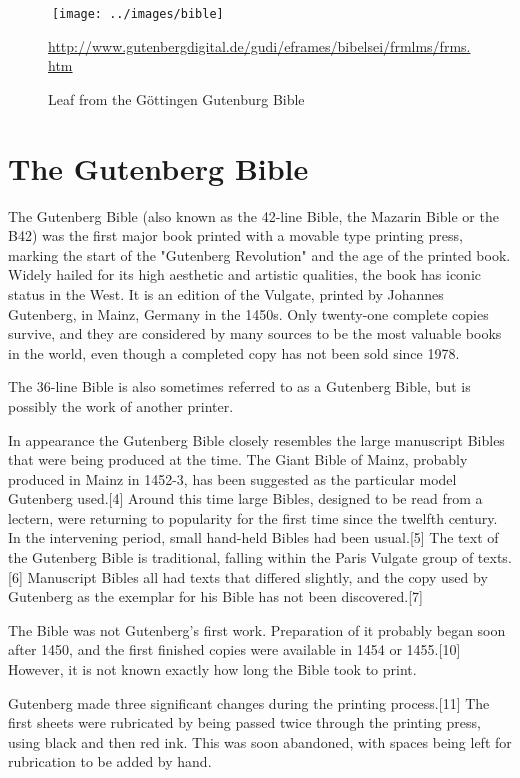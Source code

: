 {{\begin{figure*}
^^A\texttt{[image: ../images/bible]}
\caption{Leaf from the G\"ottingen Gutenburg Bible}
\url{http://www.gutenbergdigital.de/gudi/eframes/bibelsei/frmlms/frms.htm}
\label{fig:bible}
\end{figure*}

\section{The Gutenberg Bible}

The Gutenberg Bible (also known as the 42-line Bible, the Mazarin Bible or the B42) was the first major book printed with a movable type printing press, marking the start of the "Gutenberg Revolution" and the age of the printed book. Widely hailed for its high aesthetic and artistic qualities,\cite{Martin1996} the book has iconic status in the West. It is an edition of the Vulgate, printed by Johannes Gutenberg, in Mainz, Germany in the 1450s. Only twenty-one complete copies survive, and they are considered by many sources to be the most valuable books in the world, even though a completed copy has not been sold since 1978.

The 36-line Bible is also sometimes referred to as a Gutenberg Bible, but is possibly the work of another printer.

In appearance the Gutenberg Bible closely resembles the large manuscript Bibles that were being produced at the time. The Giant Bible of Mainz, probably produced in Mainz in 1452-3, has been suggested as the particular model Gutenberg used.[4] Around this time large Bibles, designed to be read from a lectern, were returning to popularity for the first time since the twelfth century. In the intervening period, small hand-held Bibles had been usual.[5] The text of the Gutenberg Bible is traditional, falling within the Paris Vulgate group of texts.[6] Manuscript Bibles all had texts that differed slightly, and the copy used by Gutenberg as the exemplar for his Bible has not been discovered.[7]

The Bible was not Gutenberg's first work.\cite{Man2002} Preparation of it probably began soon after 1450, and the first finished copies were available in 1454 or 1455.[10] However, it is not known exactly how long the Bible took to print.

Gutenberg made three significant changes during the printing process.[11] The first sheets were rubricated by being passed twice through the printing press, using black and then red ink. This was soon abandoned, with spaces being left for rubrication to be added by hand.

}}

